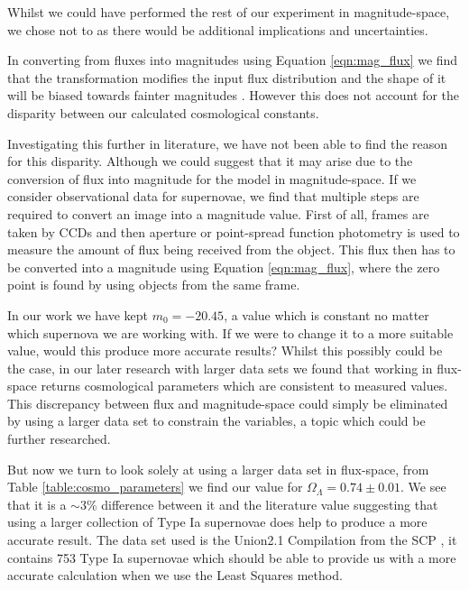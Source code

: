 \documentclass[twocolumn]{revtex4}
\begin{document}
Whilst we could have performed the rest of our experiment in magnitude-space, we chose not to as there would be additional implications and uncertainties.

In converting from fluxes into magnitudes using Equation \ref{eqn:mag_flux} we find that the transformation modifies the input flux distribution and the shape of it will be biased towards fainter magnitudes \cite{magspace_stats}. However this does not account for the disparity between our calculated cosmological constants. 

Investigating this further in literature, we have not been able to find the reason for this disparity. Although we could suggest that it may arise due to the conversion of flux into magnitude for the model in magnitude-space. If we consider observational data for supernovae, we find that multiple steps are required to convert an image into a magnitude value. First of all, frames are taken by CCDs and then aperture or point-spread function photometry is used to measure the amount of flux being received from the object. This flux then has to be converted into a magnitude using Equation \ref{eqn:mag_flux}, where the zero point is found by using objects from the same frame. 


In our work we have kept $m_0=-20.45$, a value which is constant no matter which supernova we are working with. If we were to change it to a more suitable value, would this produce more accurate results? Whilst this possibly could be the case, in our later research with larger data sets we found that working in flux-space returns cosmological parameters which are consistent to measured values. This discrepancy between flux and magnitude-space could simply be eliminated by using a larger data set to constrain the variables, a topic which could be further researched.

But now we turn to look solely at using a larger data set in flux-space, from Table \ref{table:cosmo_parameters} we find our value for $\Omega_\Lambda=0.74\pm0.01$. We see that it is a $\sim 3\%$ difference between it and the literature value suggesting that using a larger collection of Type Ia supernovae does help to produce a more accurate result. The data set used is the Union2.1 Compilation from the SCP \cite{dataset_2}, it contains 753 Type Ia supernovae which should be able to provide us with a more accurate calculation when we use the Least Squares method. 
\end{document}
